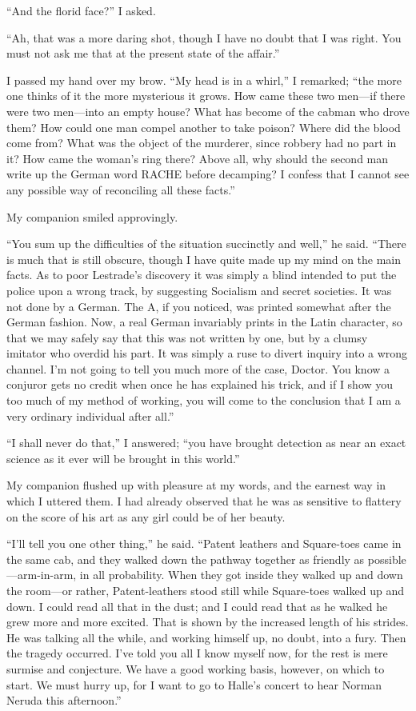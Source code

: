\documentclass[12pt]{book}
\begin{document}
“And the florid face?” I asked. 

“Ah, that was a more daring shot, though I have no doubt that I was right. You must not ask me that at the present state of the affair.” 

I passed my hand over my brow. “My head is in a whirl,” I remarked; “the more one thinks of it the more mysterious it grows. How came these two men—if there were two men—into an empty house? What has become of the cabman who drove them? How could one man compel another to take poison? Where did the blood come from? What was the object of the murderer, since robbery had no part in it? How came the woman’s ring there? Above all, why should the second man write up the German word RACHE before decamping? I confess that I cannot see any possible way of reconciling all these facts.” 

My companion smiled approvingly. 

“You sum up the difficulties of the situation succinctly and well,” he said. “There is much that is still obscure, though I have quite made up my mind on the main facts. As to poor Lestrade’s discovery it was simply a blind intended to put the police upon a wrong track, by suggesting Socialism and secret societies. It was not done by a German. The A, if you noticed, was printed somewhat after the German fashion. Now, a real German invariably prints in the Latin character, so that we may safely say that this was not written by one, but by a clumsy imitator who overdid his part. It was simply a ruse to divert inquiry into a wrong channel. I’m not going to tell you much more of the case, Doctor. You know a conjuror gets no credit when once he has explained his trick, and if I show you too much of my method of working, you will come to the conclusion that I am a very ordinary individual after all.” 

“I shall never do that,” I answered; “you have brought detection as near an exact science as it ever will be brought in this world.” 

My companion flushed up with pleasure at my words, and the earnest way in which I uttered them. I had already observed that he was as sensitive to flattery on the score of his art as any girl could be of her beauty. 

“I’ll tell you one other thing,” he said. “Patent leathers and Square-toes came in the same cab, and they walked down the pathway together as friendly as possible—arm-in-arm, in all probability. When they got inside they walked up and down the room—or rather, Patent-leathers stood still while Square-toes walked up and down. I could read all that in the dust; and I could read that as he walked he grew more and more excited. That is shown by the increased length of his strides. He was talking all the while, and working himself up, no doubt, into a fury. Then the tragedy occurred. I’ve told you all I know myself now, for the rest is mere surmise and conjecture. We have a good working basis, however, on which to start. We must hurry up, for I want to go to Halle’s concert to hear Norman Neruda this afternoon.” 
\end{document}
